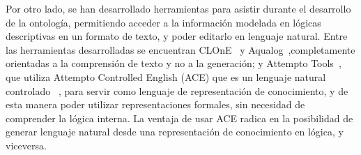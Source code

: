 Por otro lado, se han desarrollado herramientas para asistir durante el desarrollo de la ontología, permitiendo acceder a la información modelada en lógicas descriptivas en un formato de texto, y poder editarlo en lenguaje natural. Entre las herramientas desarrolladas se encuentran CLOnE~\cite{power2010complexity} y Aqualog~\cite{lopez2005aqualog},completamente orientadas a la comprensión de texto y no a la generación; y Attempto Tools~\cite{attempto}, que utiliza Attempto Controlled English  (ACE) que es un lenguaje natural controlado ~\cite{CNL}, para servir como lenguaje de representación de conocimiento, y de esta manera poder utilizar representaciones formales, sin necesidad de comprender la lógica interna. La ventaja de usar ACE radica en la posibilidad de generar lenguaje natural desde una representación de conocimiento en lógica, y viceversa.

